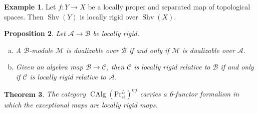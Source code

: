 \documentclass[draft]{amsart}
\newcommand{\cat}[1]{\mathcal{#1}}
\newcommand{\op}{\mathrm{op}}
\renewcommand{\Pr}{\mathrm{Pr}}
\DeclareMathOperator{\CAlg}{CAlg}
\DeclareMathOperator{\Shv}{Shv}
\newtheorem{thm}{Theorem}[section]
\newtheorem{prop}[thm]{Proposition}
\theoremstyle{definition}
\newtheorem{ex}[thm]{Example}
\begin{document}
\begin{ex}
Let $f\colon Y\to X$ be a locally proper and separated map of topological spaces. Then $\Shv(Y)$ is locally rigid over $\Shv(X)$.
\end{ex}

\begin{prop}
Let $\cat A\to \cat B$ be locally rigid. 
\begin{enumerate}[(a)]
\item A $\cat B$-module $\cat M$ is dualizable over $\cat B$ if and only if $\cat M$ is dualizable over $\cat A$.

\item Given an algebra map $\cat B\to \cat C$, then $\cat C$ is locally rigid relative to $\cat B$ if and only if $\cat C$ is locally rigid relative to $\cat A$.
\end{enumerate}
\end{prop}

\begin{thm}
The category $\CAlg(\Pr^L_{\mathrm{st}})^\op$ carries a 6-functor formalism in which the exceptional maps are locally rigid maps.
\end{thm}
\end{document}

